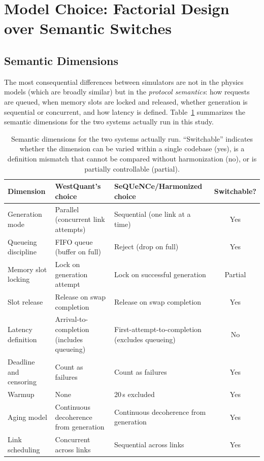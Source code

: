 \documentclass[aps,prapplied,reprint,superscriptaddress]{revtex4-2}
\begin{document}
\section{Model Choice: Factorial Design over Semantic Switches}
\label{sec:model_choice}

\subsection{Semantic Dimensions}

The most consequential differences between simulators are not in the physics models (which are broadly similar) but in the \emph{protocol semantics}: how requests are queued, when memory slots are locked and released, whether generation is sequential or concurrent, and how latency is defined. Table~\ref{tab:semantics} summarizes the semantic dimensions for the two systems actually run in this study.

\begin{table}[t]
\centering
\caption{Semantic dimensions for the two systems actually run. ``Switchable'' indicates whether the dimension can be varied within a single codebase (yes), is a definition mismatch that cannot be compared without harmonization (no), or is partially controllable (partial).}
\label{tab:semantics}
\small
\begin{tabularx}{\textwidth}{p{3.2cm}XXc}
\toprule
Dimension & WestQuant's choice & SeQUeNCe/Harmonized choice & Switchable? \\
\midrule
Generation mode & Parallel (concurrent link attempts) & Sequential (one link at a time) & Yes \\
Queueing discipline & FIFO queue (buffer on full) & Reject (drop on full) & Yes \\
Memory slot locking & Lock on generation attempt & Lock on successful generation & Partial \\
Slot release & Release on swap completion & Release on swap completion & Yes \\
Latency definition & Arrival-to-completion (includes queueing) & First-attempt-to-completion (excludes queueing) & No \\
Deadline and censoring & Count as failures & Count as failures & Yes \\
Warmup & None & 20\,s excluded & Yes \\
Aging model & Continuous decoherence from generation & Continuous decoherence from generation & Yes \\
Link scheduling & Concurrent across links & Sequential across links & Yes \\
\bottomrule
\end{tabularx}
\end{table}
\end{document}
